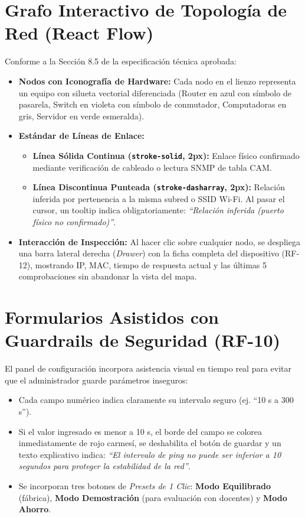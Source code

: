 \documentclass[12pt,a4paper]{report}
\begin{document}
\section{Grafo Interactivo de Topología de Red (React Flow)}
Conforme a la Sección 8.5 de la especificación técnica aprobada:
\begin{itemize}
  \item \textbf{Nodos con Iconografía de Hardware:} Cada nodo en el lienzo representa un equipo con silueta vectorial diferenciada (Router en azul con símbolo de pasarela, Switch en violeta con símbolo de conmutador, Computadoras en gris, Servidor en verde esmeralda).
  \item \textbf{Estándar de Líneas de Enlace:}
  \begin{itemize}
    \item \textbf{Línea Sólida Continua (\texttt{stroke-solid}, 2px):} Enlace físico confirmado mediante verificación de cableado o lectura SNMP de tabla CAM.
    \item \textbf{Línea Discontinua Punteada (\texttt{stroke-dasharray}, 2px):} Relación inferida por pertenencia a la misma subred o SSID Wi-Fi. Al pasar el cursor, un tooltip indica obligatoriamente: \textit{``Relación inferida (puerto físico no confirmado)''}.
  \end{itemize}
  \item \textbf{Interacción de Inspección:} Al hacer clic sobre cualquier nodo, se despliega una barra lateral derecha (\textit{Drawer}) con la ficha completa del dispositivo (RF-12), mostrando IP, MAC, tiempo de respuesta actual y las últimas 5 comprobaciones sin abandonar la vista del mapa.
\end{itemize}

\section{Formularios Asistidos con Guardrails de Seguridad (RF-10)}
El panel de configuración incorpora asistencia visual en tiempo real para evitar que el administrador guarde parámetros inseguros:
\begin{itemize}
  \item Cada campo numérico indica claramente su intervalo seguro (ej. ``10 s a 300 s'').
  \item Si el valor ingresado es menor a 10 s, el borde del campo se colorea inmediatamente de rojo carmesí, se deshabilita el botón de guardar y un texto explicativo indica: \textit{``El intervalo de ping no puede ser inferior a 10 segundos para proteger la estabilidad de la red''}.
  \item Se incorporan tres botones de \textit{Presets de 1 Clic}: \textbf{Modo Equilibrado} (fábrica), \textbf{Modo Demostración} (para evaluación con docentes) y \textbf{Modo Ahorro}.
\end{itemize}
\end{document}
